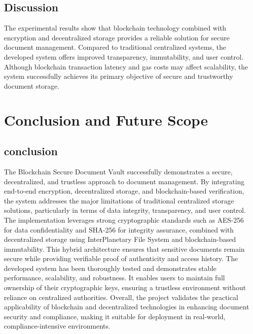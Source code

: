 \documentclass[12pt]{article}
\begin{document}
\subsection{Discussion}
The experimental results show that blockchain technology combined with encryption and decentralized storage provides a reliable solution for secure document management. Compared to traditional centralized systems, the developed system offers improved transparency, immutability, and user control. Although blockchain transaction latency and gas costs may affect scalability, the system successfully achieves its primary objective of secure and trustworthy document storage.

\newpage
\section{Conclusion and Future Scope}

\subsection{conclusion}
The Blockchain Secure Document Vault successfully demonstrates a secure, decentralized, and trustless approach to document management. By integrating end-to-end encryption, decentralized storage, and blockchain-based verification, the system addresses the major limitations of traditional centralized storage solutions, particularly in terms of data integrity, transparency, and user control. The implementation leverages strong cryptographic standards such as AES-256 for data confidentiality and SHA-256 for integrity assurance, combined with decentralized storage using InterPlanetary File System and blockchain-based immutability. This hybrid architecture ensures that sensitive documents remain secure while providing verifiable proof of authenticity and access history. The developed system has been thoroughly tested and demonstrates stable performance, scalability, and robustness. It enables users to maintain full ownership of their cryptographic keys, ensuring a trustless environment without reliance on centralized authorities. Overall, the project validates the practical applicability of blockchain and decentralized technologies in enhancing document security and compliance, making it suitable for deployment in real-world, compliance-intensive environments.
\end{document}
